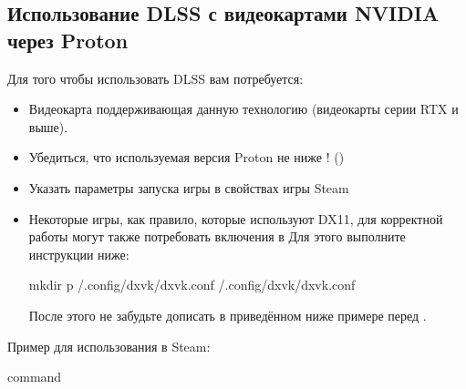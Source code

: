 \documentclass[letterpaper,10pt,russian,openany]{sphinxmanual}
\begin{document}
\subsection{Использование DLSS с видеокартами NVIDIA через Proton}
\label{\detokenize{source/linux-gaming:dlss-nvidia-proton}}\label{\detokenize{source/linux-gaming:nvidia-dlss-with-proton}}\label{\detokenize{source/linux-gaming:index-17}}
\sphinxAtStartPar
Для того чтобы использовать DLSS вам потребуется:
\begin{itemize}
\item {} 
\sphinxAtStartPar
Видеокарта поддерживающая данную технологию (видеокарты серии RTX и выше).

\item {} 
\sphinxAtStartPar
Убедиться, что используемая версия Proton не ниже ! ()

\item {} 
\sphinxAtStartPar
Указать параметры запуска игры в свойствах игры Steam 

\item {} 
\sphinxAtStartPar
Некоторые игры, как правило, которые используют DX11, для корректной работы могут также потребовать включения  в 
Для этого выполните инструкции ниже:

\begin{sphinxVerbatim}[commandchars=\\\{\}]
mkdir \PYGZhy{}p \PYGZti{}/.config/dxvk/dxvk.conf
  \PYGZgt{} \PYGZti{}/.config/dxvk/dxvk.conf
\end{sphinxVerbatim}

\sphinxAtStartPar
После этого не забудьте дописать  в приведённом ниже примере перед .

\end{itemize}

\sphinxAtStartPar
Пример для использования в Steam:

\begin{sphinxVerbatim}[commandchars=\\\{\}]
  \PYGZpc{}command\PYGZpc{}
\end{sphinxVerbatim}
\end{document}
